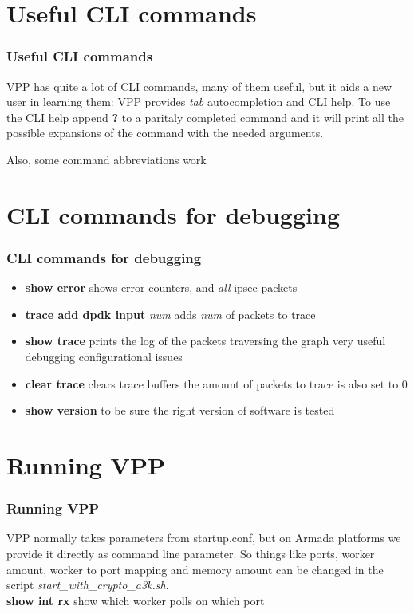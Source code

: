 \documentclass{beamer}
\begin{document}
\section{Useful CLI commands}
  \begin{frame}
  \frametitle{Useful CLI commands}
  VPP has quite a lot of CLI commands, many of them useful,
  but it aids a new user in learning them:
  VPP provides \textit{tab} autocompletion and CLI help.
  To use the CLI help append \textbf{?} to a paritaly completed command
  and it will print all the possible expansions of the command with
  the needed arguments.
  
  \vfill
  
  \tiny{Also, some command abbreviations work}
  \end{frame}
      
\section{CLI commands for debugging}
  \begin{frame}
  \frametitle{CLI commands for debugging}
  \begin{itemize}
  \item \textbf{show error} shows error counters, and \textit{all} ipsec packets
  \item \textbf{trace add dpdk input} \textit{num} adds \textit{num} of packets to trace
  \item \textbf{show trace} prints the log of the packets traversing the graph 
          {\tiny very useful debugging configurational issues}
  \item \textbf{clear trace} clears trace buffers {\tiny the amount of packets to trace is also set to 0}
  \item \textbf{show version} to be sure the right version of software is tested
  \end{itemize}
  \end{frame}

\section{Running VPP}
  \begin{frame}
  \frametitle{Running VPP}
  VPP normally takes parameters from startup.conf, but on Armada platforms we
  provide it directly as command line parameter. So things like
  ports, worker amount, worker to port mapping and memory amount 
  can be changed in the script
  \textit{start\_with\_crypto\_a3k.sh}. \\
  \textbf{show int rx} show which worker polls on which port
  \end{frame}
\end{document}
